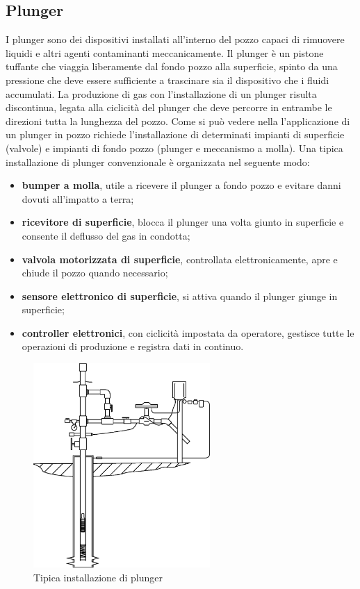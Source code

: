 \subsection{Plunger}

I plunger sono dei dispositivi installati all'interno del pozzo capaci di rimuovere liquidi e altri agenti contaminanti meccanicamente. Il plunger è un pistone tuffante che viaggia liberamente dal fondo pozzo alla superficie, spinto da una pressione che deve essere sufficiente a trascinare sia il dispositivo che i fluidi accumulati. La produzione di gas con l'installazione di un plunger risulta discontinua, legata alla ciclicità del plunger che deve percorre in entrambe le direzioni tutta la lunghezza del pozzo. Come si può vedere nella  l'applicazione di un plunger in pozzo richiede l'installazione di determinati impianti di superficie (valvole) e impianti di fondo pozzo (plunger e meccanismo a molla). Una tipica installazione di plunger convenzionale è organizzata nel seguente modo:

\begin{itemize}
    \item \textbf{bumper a molla}, utile a ricevere il plunger a fondo pozzo e evitare danni dovuti all'impatto a terra;
    \item \textbf{ricevitore di superficie}, blocca il plunger una volta giunto in superficie e consente il deflusso del gas in condotta;
    \item \textbf{valvola motorizzata di superficie}, controllata elettronicamente, apre e chiude il pozzo quando necessario;
    \item \textbf{sensore elettronico di superficie}, si attiva quando il plunger giunge in superficie;
    \item \textbf{controller elettronici}, con ciclicità impostata da operatore, gestisce tutte le operazioni di produzione e registra dati in continuo.
\end{itemize}

\begin{figure}[htbp]
    \centering
    \includegraphics[width=0.6\textwidth]{fig/foamer/plunger-installation.eps}
    \caption{Tipica installazione di plunger \parencite{lea2011gas}}
    \label{fig:plunger-installation}
\end{figure}

